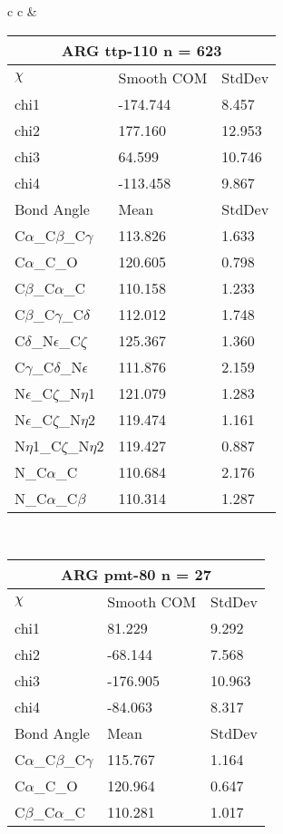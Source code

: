 \begin{longtable}{ c c }
  &
  \begin{tabular}{ l l l }
  \toprule
  \multicolumn{3}{c}{ARG \textbf{ttp-110} n = 623} \\ \toprule
  $\chi$       & Smooth COM & StdDev \\ \midrule
  chi1 & -174.744 & 8.457 \\ 
  chi2 & 177.160 & 12.953 \\ 
  chi3 & 64.599 & 10.746 \\ 
  chi4 & -113.458 & 9.867 \\ \midrule
  Bond Angle   & Mean     & StdDev \\ \midrule
  C$\alpha$\_C$\beta$\_C$\gamma$ & 113.826 & 1.633\\
  C$\alpha$\_C\_O & 120.605 & 0.798\\
  C$\beta$\_C$\alpha$\_C & 110.158 & 1.233\\
  C$\beta$\_C$\gamma$\_C$\delta$ & 112.012 & 1.748\\
  C$\delta$\_N$\epsilon$\_C$\zeta$ & 125.367 & 1.360\\
  C$\gamma$\_C$\delta$\_N$\epsilon$ & 111.876 & 2.159\\
  N$\epsilon$\_C$\zeta$\_N$\eta$1 & 121.079 & 1.283\\
  N$\epsilon$\_C$\zeta$\_N$\eta$2 & 119.474 & 1.161\\
  N$\eta$1\_C$\zeta$\_N$\eta$2 & 119.427 & 0.887\\
  N\_C$\alpha$\_C & 110.684 & 2.176\\
  N\_C$\alpha$\_C$\beta$ & 110.314 & 1.287\\
  \bottomrule
  \end{tabular}
  \\
  \begin{tabular}{ l l l }
  \toprule
  \multicolumn{3}{c}{ARG \textbf{pmt-80} n = 27} \\ \toprule
  $\chi$       & Smooth COM & StdDev \\ \midrule
  chi1 & 81.229 & 9.292 \\ 
  chi2 & -68.144 & 7.568 \\ 
  chi3 & -176.905 & 10.963 \\ 
  chi4 & -84.063 & 8.317 \\ \midrule
  Bond Angle   & Mean     & StdDev \\ \midrule
  C$\alpha$\_C$\beta$\_C$\gamma$ & 115.767 & 1.164\\
  C$\alpha$\_C\_O & 120.964 & 0.647\\
  C$\beta$\_C$\alpha$\_C & 110.281 & 1.017\\

\end{tabular}
\end{longtable}
